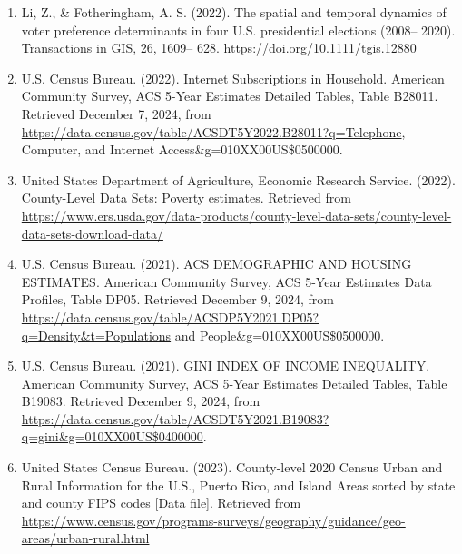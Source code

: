 \documentclass[
]{article}
\begin{document}
\begin{enumerate}
\def\labelenumi{\arabic{enumi}.}
\item
  Li, Z., \& Fotheringham, A. S. (2022). The spatial and temporal
  dynamics of voter preference determinants in four U.S. presidential
  elections (2008-- 2020). Transactions in GIS, 26, 1609-- 628.
  \url{https://doi.org/10.1111/tgis.12880}
\item
  U.S. Census Bureau. (2022). Internet Subscriptions in Household.
  American Community Survey, ACS 5-Year Estimates Detailed Tables, Table
  B28011. Retrieved December 7, 2024, from
  \url{https://data.census.gov/table/ACSDT5Y2022.B28011?q=Telephone},
  Computer, and Internet Access\&g=010XX00US\$0500000.
\item
  United States Department of Agriculture, Economic Research Service.
  (2022). County-Level Data Sets: Poverty estimates. Retrieved from
  \url{https://www.ers.usda.gov/data-products/county-level-data-sets/county-level-data-sets-download-data/}
\item
  U.S. Census Bureau. (2021). ACS DEMOGRAPHIC AND HOUSING ESTIMATES.
  American Community Survey, ACS 5-Year Estimates Data Profiles, Table
  DP05. Retrieved December 9, 2024, from
  \url{https://data.census.gov/table/ACSDP5Y2021.DP05?q=Density&t=Populations}
  and People\&g=010XX00US\$0500000.
\item
  U.S. Census Bureau. (2021). GINI INDEX OF INCOME INEQUALITY. American
  Community Survey, ACS 5-Year Estimates Detailed Tables, Table B19083.
  Retrieved December 9, 2024, from
  \url{https://data.census.gov/table/ACSDT5Y2021.B19083?q=gini&g=010XX00US$0400000}.
\item
  United States Census Bureau. (2023). County-level 2020 Census Urban
  and Rural Information for the U.S., Puerto Rico, and Island Areas
  sorted by state and county FIPS codes {[}Data file{]}. Retrieved from
  \url{https://www.census.gov/programs-surveys/geography/guidance/geo-areas/urban-rural.html}
\end{enumerate}
\end{document}
